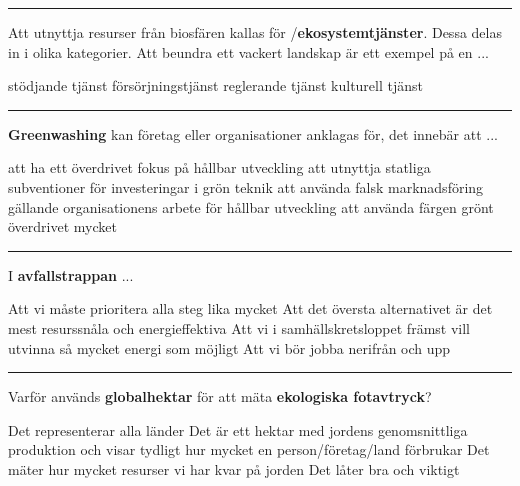 \documentclass{exam}
\begin{document}
\begin{questions}
\vspace{5mm} 
\hrule 
\vspace{5mm} 

\question Att utnyttja resurser från biosfären kallas för /\textbf{ekosystemtjänster}. Dessa delas in i olika kategorier. Att beundra ett vackert landskap är ett exempel på en ... 
\vspace{2mm}
\begin{checkboxes}
    \choice stödjande tjänst
    \choice försörjningstjänst
    \choice reglerande tjänst
    \choice kulturell tjänst
\end{checkboxes}

\vspace{5mm} 
\hrule 
\vspace{5mm} 

\break

\question \textbf{Greenwashing} kan företag eller organisationer anklagas för, det innebär att ...
\vspace{2mm}
\begin{checkboxes}
    \choice att ha ett överdrivet fokus på hållbar utveckling
    \choice att utnyttja statliga subventioner för investeringar i grön teknik
    \choice att använda falsk marknadsföring gällande organisationens arbete för hållbar utveckling
    \choice att använda färgen grönt överdrivet mycket
\end{checkboxes}

\vspace{5mm} 
\hrule 
\vspace{5mm} 

\question I \textbf{avfallstrappan} ...
\vspace{2mm}
\begin{checkboxes}
    \choice Att vi måste prioritera alla steg lika mycket
    \choice Att det översta alternativet är det mest resurssnåla och energieffektiva
    \choice Att vi i samhällskretsloppet främst vill utvinna så mycket energi som möjligt
    \choice Att vi bör jobba nerifrån och upp
\end{checkboxes}

\vspace{5mm} 
\hrule 
\vspace{5mm} 

\question Varför används \textbf{globalhektar} för att mäta \textbf{ekologiska fotavtryck}?
\vspace{2mm}
\begin{checkboxes}
    \choice Det representerar alla länder
    \choice Det är ett hektar med jordens genomsnittliga produktion och visar tydligt hur mycket en person/företag/land förbrukar
    \choice Det mäter hur mycket resurser vi har kvar på jorden
    \choice Det låter bra och viktigt
\end{checkboxes}


\end{questions}
\end{document}
